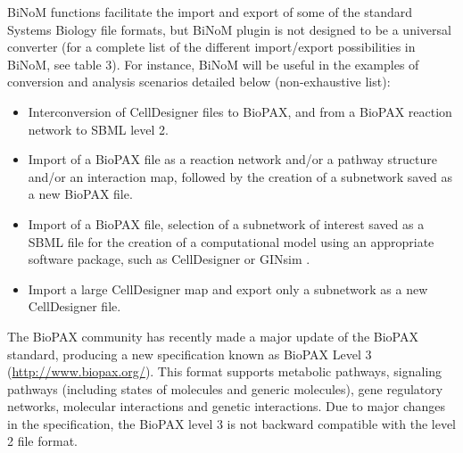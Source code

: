 \documentclass[10pt]{bmc_article}
\newenvironment{bmcformat}{\baselineskip20pt\sloppy\setboolean{publ}{false}}{\baselineskip20pt\sloppy}
\begin{document}
\begin{bmcformat}
BiNoM functions facilitate the import and export of some of the standard Systems
Biology file formats, but BiNoM plugin is not designed to be a universal
converter (for a complete list of the different import/export possibilities in
BiNoM, see table 3).
For instance, BiNoM will be useful in the examples of conversion and analysis
scenarios detailed below (non-exhaustive list):

\begin{itemize}

\item Interconversion of CellDesigner files to BioPAX, and from a BioPAX
reaction network to SBML level 2.

\item Import of a BioPAX file as a reaction network and/or a pathway structure
and/or an interaction map, followed by the creation of a subnetwork
saved as a new BioPAX file.

\item Import of a BioPAX file, selection of a subnetwork of interest saved as a
SBML file for
the creation of a computational model using an appropriate software package,
such as CellDesigner \cite{funahashi2003celldesigner} or GINsim
\cite{gonzalez2006ginsim}.

\item Import a large CellDesigner map and export only a subnetwork as a new CellDesigner file.

\end{itemize}

The BioPAX
community has recently made a major update of the BioPAX standard, producing a
new specification known as BioPAX Level 3 (\url{http://www.biopax.org/}). This
format supports metabolic pathways, signaling pathways (including states of molecules
and generic molecules), gene regulatory networks, molecular interactions and
genetic interactions. Due to major changes in the
specification, the BioPAX level 3 is not backward compatible with the level 2 file format.


\end{bmcformat}
\end{document}
